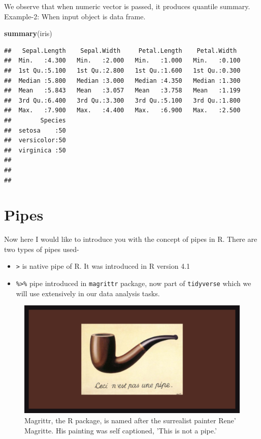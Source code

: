 \documentclass[
]{book}
\newenvironment{Shaded}{\begin{snugshade}}{\end{snugshade}}
\newcommand{\FunctionTok}[1]{\textcolor[rgb]{0.13,0.29,0.53}{\textbf{#1}}}
\newcommand{\NormalTok}[1]{#1}
\providecommand{\tightlist}{%
  \setlength{\itemsep}{0pt}\setlength{\parskip}{0pt}}
\begin{document}
We observe that when numeric vector is passed, it produces quantile summary. Example-2: When input object is data frame.

\begin{Shaded}
\begin{Highlighting}[]
\FunctionTok{summary}\NormalTok{(iris)}
\end{Highlighting}
\end{Shaded}

\begin{verbatim}
##   Sepal.Length    Sepal.Width     Petal.Length    Petal.Width   
##  Min.   :4.300   Min.   :2.000   Min.   :1.000   Min.   :0.100  
##  1st Qu.:5.100   1st Qu.:2.800   1st Qu.:1.600   1st Qu.:0.300  
##  Median :5.800   Median :3.000   Median :4.350   Median :1.300  
##  Mean   :5.843   Mean   :3.057   Mean   :3.758   Mean   :1.199  
##  3rd Qu.:6.400   3rd Qu.:3.300   3rd Qu.:5.100   3rd Qu.:1.800  
##  Max.   :7.900   Max.   :4.400   Max.   :6.900   Max.   :2.500  
##        Species  
##  setosa    :50  
##  versicolor:50  
##  virginica :50  
##                 
##                 
## 
\end{verbatim}

\hypertarget{pipes}{%
\section{Pipes}\label{pipes}}

Now here I would like to introduce you with the concept of pipes in R. There are two types of pipes used-

\begin{itemize}
\tightlist
\item
  \texttt{\textbar{}\textgreater{}} is native pipe of R. It was introduced in R version 4.1
\item
  \texttt{\%\textgreater{}\%} pipe introduced in \texttt{magrittr} package\citep{R-magrittr}, now part of \texttt{tidyverse} which we will use extensively in our data analysis tasks.
\end{itemize}

\begin{figure}

{\centering \includegraphics[width=0.99\linewidth]{images/pipemag} 

}

\caption{Magrittr, the R package, is named after the surrealist painter Rene' Magritte. His painting was self captioned, 'This is not a pipe.'}\label{fig:pipe2}
\end{figure}
\end{document}
